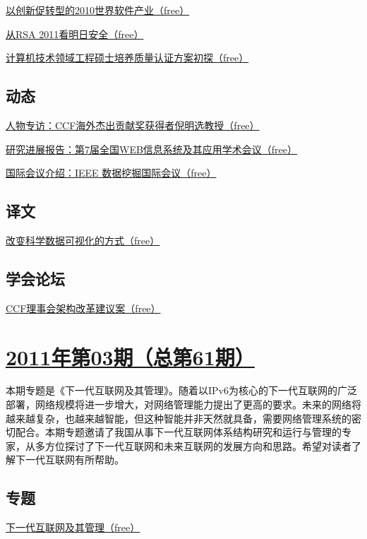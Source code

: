 \documentclass[a4paper]{article}
\begin{document}
\href{http://history.ccf.org.cn/resources/1190201776262/2011/04/20/9.pdf}{以创新促转型的2010世界软件产业（free）}

\href{http://history.ccf.org.cn/resources/1190201776262/2011/04/20/10.pdf}{从RSA 2011看明日安全（free）}

\href{http://history.ccf.org.cn/resources/1190201776262/2011/04/20/11.pdf}{计算机技术领域工程硕士培养质量认证方案初探（free）}

\subsection{动态}
\href{http://history.ccf.org.cn/resources/1190201776262/2011/04/20/16.pdf}{人物专访：CCF海外杰出贡献奖获得者倪明选教授（free）}

\href{http://history.ccf.org.cn/resources/1190201776262/2011/04/20/17.pdf}{研究进展报告：第7届全国WEB信息系统及其应用学术会议（free）}

\href{http://history.ccf.org.cn/resources/1190201776262/2011/04/20/18.pdf}{国际会议介绍：IEEE 数据挖掘国际会议（free）}

\subsection{译文}
\href{http://history.ccf.org.cn/resources/1190201776262/2011/04/20/19.pdf}{改变科学数据可视化的方式（free）}

\subsection{学会论坛}
\href{http://history.ccf.org.cn/resources/1190201776262/2011/04/20/20.pdf}{CCF理事会架构改革建议案（free）}


\section{\href{http://history.ccf.org.cn/sites/ccf/jsjtbbd.jsp?contentId=2601260996998}{\textbf{2011年第03期（总第61期）}}}
本期专题是《下一代互联网及其管理》。随着以IPv6为核心的下一代互联网的广泛部署，网络规模将进一步增大，对网络管理能力提出了更高的要求。未来的网络将越来越复杂，也越来越智能，但这种智能并非天然就具备，需要网络管理系统的密切配合。本期专题邀请了我国从事下一代互联网体系结构研究和运行与管理的专家，从多方位探讨了下一代互联网和未来互联网的发展方向和思路。希望对读者了解下一代互联网有所帮助。
\subsection{专题}
\href{http://history.ccf.org.cn/resources/1190201776262/2011/03/22/2.pdf}{下一代互联网及其管理（free）}
\end{document}
